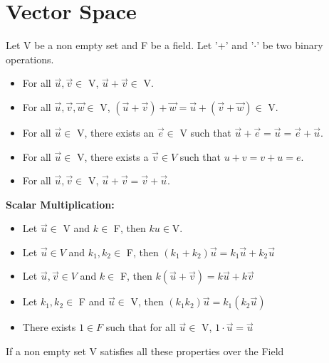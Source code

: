 \documentclass[a4paper, titlepage]{article}
\begin{document}
\begin{center}
    \date{$6^{\text{th}}$ September 2021}
\end{center}

\section{Vector Space}

Let V be a non empty set and F be a field. Let '+' and '$\cdot$' 
be two binary operations.
\begin{description}
    \item[\textbf{Vector Addition:}] \hfill
    \begin{itemize}
        \item For all $ \vec{u}, \vec{v} \in $ V, $ \vec{u} + \vec{v} \in $ V. 
        \item For all $ \vec{u}, \vec{v}, \vec{w} \in $ V, $ (\vec{u} + \vec{v}) + \vec{w} = \vec{u} + (\vec{v} + \vec{w}) \in $ V. 
        \item For all $ \vec{u} \in $ V, there exists an $\vec{e} \in $ V such
        that $ \vec{u} + \vec{e} = \vec{u} = \vec{e} + \vec{u} $. 
        \item For all $ \vec{u} \in $ V, there exists a $ \vec{v} \in V $ 
        such that $ u + v = v + u = e $. 
        \item For all $ \vec{u}, \vec{v} \in $ V, $ \vec{u} + \vec{v} = \vec{v} + \vec{u} $. 
    \end{itemize}
    \item \textbf{Scalar Multiplication: } \hfill
    \begin{itemize}
        \item Let $ \vec{u} \in $ V and $ k \in $ F, then 
        $ ku \in $V.
        \item Let $ \vec u \in V $ and $ k_1, k_2 \in $ F, then 
        $ (k_1 + k_2)\vec{u} = k_1\vec{u} + k_2\vec{u} $ 
        \item Let $ \vec{u}, \vec{v} \in V $ and $ k \in $ F,
        then $ k(\vec u + \vec v) = k\vec u + k\vec v $
        \item Let $ k_1, k_2 \in $ F and $ \vec u \in $ V, then
        $ (k_1k_2)\vec u = k_1(k_2\vec u)  $ 
        \item There exists $ 1 \in F $ such that for all $ \vec u
        \in $ V, $ 1\cdot\vec u = \vec u$
    \end{itemize}
\end{description}
If a non empty set V satisfies all these properties over the Field
\end{document}
